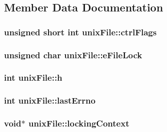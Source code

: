 \subsection{Member Data Documentation}
\hypertarget{structunix_file_a05d9d0af8aa4d9de6a250984cc12ae56}{
\subsubsection[{ctrl\-Flags}]{\setlength{\rightskip}{0pt plus 5cm}unsigned short int unix\-File\-::ctrl\-Flags}}\label{structunix_file_a05d9d0af8aa4d9de6a250984cc12ae56}
\hypertarget{structunix_file_a001e59bdb9d3f396952c2c8e3229f7fc}{
\subsubsection[{e\-File\-Lock}]{\setlength{\rightskip}{0pt plus 5cm}unsigned char unix\-File\-::e\-File\-Lock}}\label{structunix_file_a001e59bdb9d3f396952c2c8e3229f7fc}
\hypertarget{structunix_file_a1c58798d4ff3ac6232765c8b76bb7450}{
\subsubsection[{h}]{\setlength{\rightskip}{0pt plus 5cm}int unix\-File\-::h}}\label{structunix_file_a1c58798d4ff3ac6232765c8b76bb7450}
\hypertarget{structunix_file_afde57c2e118fac8041918dac2ee6f7d1}{
\subsubsection[{last\-Errno}]{\setlength{\rightskip}{0pt plus 5cm}int unix\-File\-::last\-Errno}}\label{structunix_file_afde57c2e118fac8041918dac2ee6f7d1}
\hypertarget{structunix_file_afaeb4425a6de3e913db4b03e8a0d098a}{
\subsubsection[{locking\-Context}]{\setlength{\rightskip}{0pt plus 5cm}void$\ast$ unix\-File\-::locking\-Context}}\label{structunix_file_afaeb4425a6de3e913db4b03e8a0d098a}
